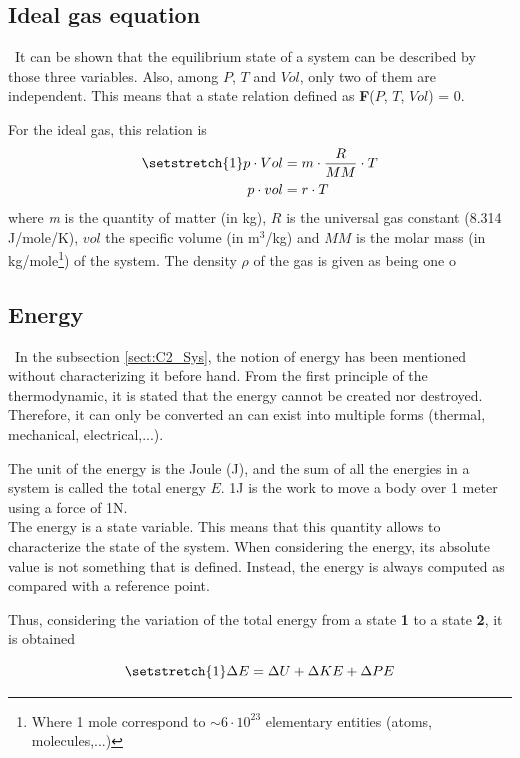 \subsection{Ideal gas equation}
\quad\, It can be shown that the equilibrium state of a system can be described by those three variables. Also, among $P$, $T$ and $Vol$, only two of them are independent. This means that a state relation defined as \textbf{F}($P$, $T$, $Vol$) = 0.

For the ideal gas, this relation is
\begin{align}
\setstretch{1}
p\cdot Vol &= m\cdot\frac{R}{MM}\cdot T\nonumber\\
p\cdot vol &= r\cdot T\label{eq:C2_GP}    
\end{align}
where \textit{m} is the quantity of matter (in kg), $R$ is the universal gas constant (8.314 J/mole/K), $vol$ the specific volume (in m$^3$/kg) and $MM$ is the molar mass (in kg/mole\footnote{Where 1 mole correspond to $\sim 6\cdot 10^{23}$ elementary entities (atoms, molecules,...)}) of the system. The density $\rho$ of the gas is given as being one o

\subsection{Energy}\label{sect:C2_Ener}
\quad\, In the subsection \ref{sect:C2_Sys}, the notion of energy has been mentioned without characterizing it before hand. From the first principle of the thermodynamic, it is stated that the energy cannot be created nor destroyed. Therefore, it can only be converted an can exist into multiple forms (thermal, mechanical, electrical,...)\cite{thermoApp_2}. 

The unit of the energy is the Joule (J), and the sum of all the energies in a system is called the total energy $E$. 1J is the work to move a body over 1 meter using a force of 1N.\\


The energy is a state variable. This means that this quantity allows to characterize the state of the system. When considering the energy, its absolute value is not something that is defined. Instead, the energy is always computed as compared with a reference point.

Thus, considering the variation of the total energy from a state \textbf{1} to a state \textbf{2}, it is obtained

\begin{equation}
\setstretch{1}
    \Delta E = \Delta U + \Delta KE + \Delta PE \label{eq:C2_E}
\end{equation}

